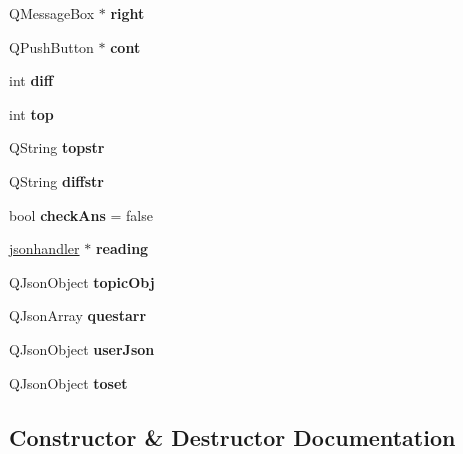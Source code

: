 \begin{DoxyCompactItemize}
Q\+Message\+Box $\ast$ {\bfseries right}
\item 
\mbox{\label{classquests_aa76fcb10663af9f33ab7db4510ca8b43}} 
Q\+Push\+Button $\ast$ {\bfseries cont}
\item 
\mbox{\label{classquests_a57494db64b7534f0115d3c23a0605ed9}} 
int {\bfseries diff}
\item 
\mbox{\label{classquests_a476e29551a2b193da15696909258e528}} 
int {\bfseries top}
\item 
\mbox{\label{classquests_aab0abd39005660685421869e31fd9787}} 
Q\+String {\bfseries topstr}
\item 
\mbox{\label{classquests_ae62ee81de89c87281fecb2f1a6e908b8}} 
Q\+String {\bfseries diffstr}
\item 
\mbox{\label{classquests_a8a26e27c9a3a7546cc5f7ac423ad390f}} 
bool {\bfseries check\+Ans} = false
\item 
\mbox{\label{classquests_abe054cb4aec7857fa3825ed71401cd50}} 
\hyperlink{classjsonhandler}{jsonhandler} $\ast$ {\bfseries reading}
\item 
\mbox{\label{classquests_af057143e74e88b01a61dd27492df0359}} 
Q\+Json\+Object {\bfseries topic\+Obj}
\item 
\mbox{\label{classquests_aa57fba21458dc3db49042c8596d33c1e}} 
Q\+Json\+Array {\bfseries questarr}
\item 
\mbox{\label{classquests_ac7598d5e31f0531fb63451f4693ea8a4}} 
Q\+Json\+Object {\bfseries user\+Json}
\item 
\mbox{\label{classquests_adb7f576cd1a17da6b4f930f9e996cb6e}} 
Q\+Json\+Object {\bfseries toset}
\end{DoxyCompactItemize}


\subsection{Constructor \& Destructor Documentation}
\mbox{\label{classquests_a54541119f891382cdda66b247edc090b}} 
